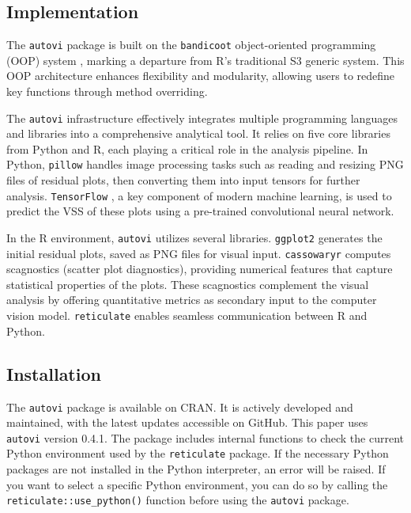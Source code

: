 \documentclass[
doublespace,
  times]{anzsauth}
\begin{document}
\subsection{Implementation}\label{sec-autovi-implementation}

The \texttt{autovi} package is built on the \texttt{bandicoot}
object-oriented programming (OOP) system \citep{bandicoot}, marking a
departure from R's traditional S3 generic system. This OOP architecture
enhances flexibility and modularity, allowing users to redefine key
functions through method overriding.

The \texttt{autovi} infrastructure effectively integrates multiple
programming languages and libraries into a comprehensive analytical
tool. It relies on five core libraries from Python and R, each playing a
critical role in the analysis pipeline. In Python, \texttt{pillow}
\citep{clark2015pillow} handles image processing tasks such as reading
and resizing PNG files of residual plots, then converting them into
input tensors for further analysis. \texttt{TensorFlow}
\citep{abadi2016tensorflow}, a key component of modern machine learning,
is used to predict the VSS of these plots using a pre-trained
convolutional neural network.

In the R environment, \texttt{autovi} utilizes several libraries.
\texttt{ggplot2} \citep{ggplot2} generates the initial residual plots,
saved as PNG files for visual input. \texttt{cassowaryr}
\citep{mason2022cassowaryr} computes scagnostics (scatter plot
diagnostics), providing numerical features that capture statistical
properties of the plots. These scagnostics complement the visual
analysis by offering quantitative metrics as secondary input to the
computer vision model. \texttt{reticulate} \citep{reticulate} enables
seamless communication between R and Python.

\subsection{Installation}\label{installation}

The \texttt{autovi} package is available on CRAN. It is actively
developed and maintained, with the latest updates accessible on GitHub.
This paper uses \texttt{autovi} version 0.4.1. The package includes
internal functions to check the current Python environment used by the
\texttt{reticulate} package. If the necessary Python packages are not
installed in the Python interpreter, an error will be raised. If you
want to select a specific Python environment, you can do so by calling
the \texttt{reticulate::use\_python()} function before using the
\texttt{autovi} package.
\end{document}
